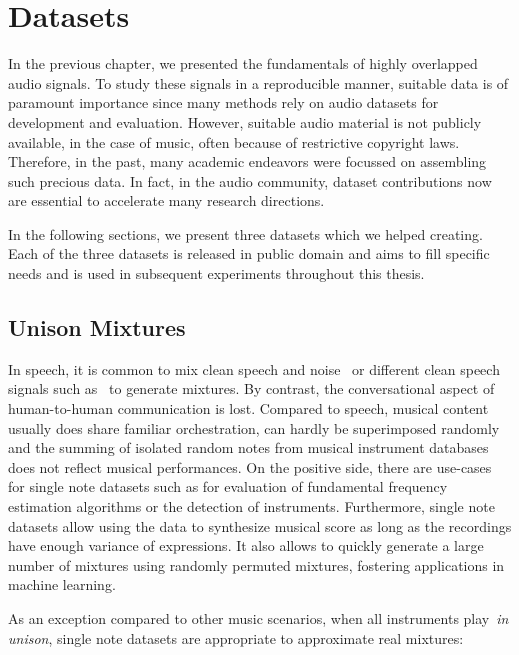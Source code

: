\chapter{Datasets}
\label{cha:datasets}

In the previous chapter, we presented the fundamentals of highly overlapped audio signals.
To study these signals in a reproducible manner, suitable data is of paramount importance since many methods rely on audio datasets for development and evaluation.
However, suitable audio material is not publicly available, in the case of music, often because of restrictive copyright laws. 
Therefore, in the past, many academic endeavors were focussed on assembling such precious data. 
In fact, in the audio community, dataset contributions now are essential to accelerate many research directions.
\par
In the following sections, we present three datasets which we helped creating.
Each of the three datasets is released in public domain and aims to fill specific needs and is used in subsequent experiments throughout this thesis.

\section{Unison Mixtures}
\label{sec:unison_dataset}


In speech, it is common to mix clean speech and noise~\cite{varga93} or different clean speech signals such as~\cite{garofolo93} to generate mixtures.
By contrast, the conversational aspect of human-to-human communication is lost.
Compared to speech, musical content usually does share familiar orchestration, can hardly be superimposed randomly and the summing of isolated random notes from musical instrument databases does not reflect musical performances.
On the positive side, there are use-cases for single note datasets such as for evaluation of fundamental frequency estimation algorithms or the detection of instruments.
Furthermore, single note datasets allow using the data to synthesize musical score as long as the recordings have enough variance of expressions.
It also allows to quickly generate a large number of mixtures using randomly permuted mixtures, fostering applications in machine learning.

As an exception compared to other music scenarios, when all instruments play~\emph{in unison}, single note datasets are appropriate to approximate real mixtures:

